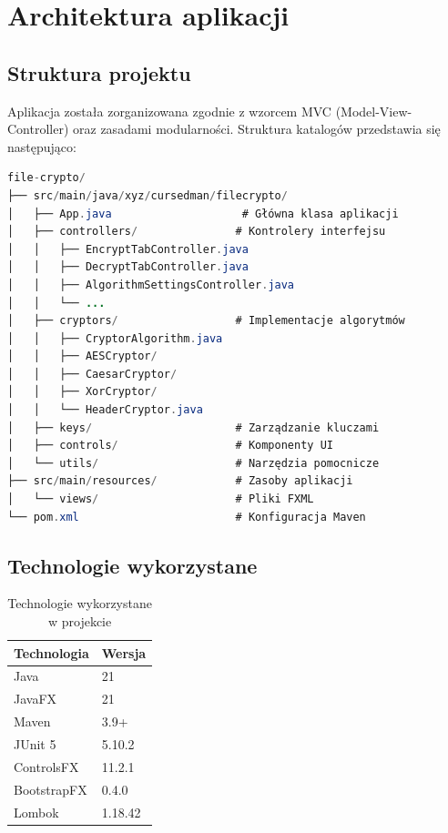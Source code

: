 \documentclass[12pt,a4paper]{article}
\begin{document}
\section{Architektura aplikacji}

\subsection{Struktura projektu}

Aplikacja została zorganizowana zgodnie z wzorcem MVC (Model-View-Controller) oraz zasadami modularności. Struktura katalogów przedstawia się następująco:

\begin{lstlisting}[language=java, caption=Struktura projektu, basicstyle=\ttfamily\tiny]
file-crypto/
├── src/main/java/xyz/cursedman/filecrypto/
│   ├── App.java                    # Główna klasa aplikacji
│   ├── controllers/               # Kontrolery interfejsu
│   │   ├── EncryptTabController.java
│   │   ├── DecryptTabController.java
│   │   ├── AlgorithmSettingsController.java
│   │   └── ...
│   ├── cryptors/                  # Implementacje algorytmów
│   │   ├── CryptorAlgorithm.java
│   │   ├── AESCryptor/
│   │   ├── CaesarCryptor/
│   │   ├── XorCryptor/
│   │   └── HeaderCryptor.java
│   ├── keys/                      # Zarządzanie kluczami
│   ├── controls/                  # Komponenty UI
│   └── utils/                     # Narzędzia pomocnicze
├── src/main/resources/            # Zasoby aplikacji
│   └── views/                     # Pliki FXML
└── pom.xml                        # Konfiguracja Maven
\end{lstlisting}

\subsection{Technologie wykorzystane}

\begin{table}[H]
\centering
\caption{Technologie wykorzystane w projekcie}
\label{tab:technologies}
\begin{tabular}{@{}ll@{}}
\toprule
Technologia & Wersja \\
\midrule
Java & 21 \\
JavaFX & 21 \\
Maven & 3.9+ \\
JUnit 5 & 5.10.2 \\
ControlsFX & 11.2.1 \\
BootstrapFX & 0.4.0 \\
Lombok & 1.18.42 \\
\bottomrule
\end{tabular}
\end{table}
\end{document}
